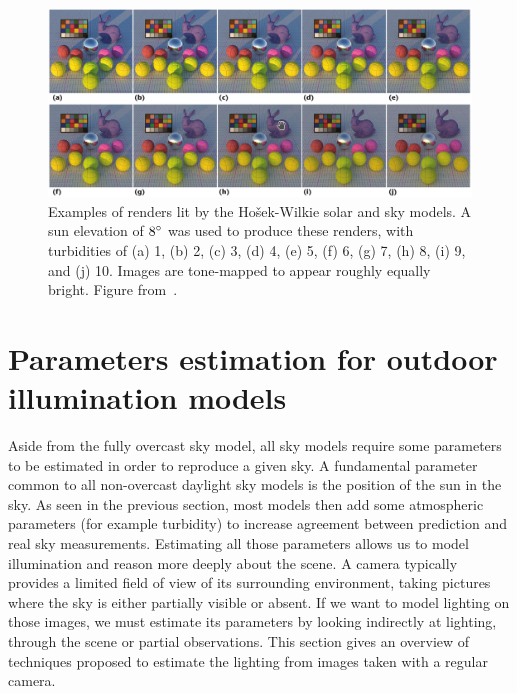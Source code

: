 \begin{figure}
\centering
\includegraphics[width=0.96\linewidth]{3rdparty/hwsun-renders.png}
\caption[Examples renders lit by the Ho\v{s}ek-Wilkie solar and sky models]{Examples of renders lit by the Ho\v{s}ek-Wilkie solar and sky models. A sun elevation of $8^{\circ}$ was used to produce these renders, with turbidities of (a) 1, (b) 2, (c) 3, (d) 4, (e) 5, (f) 6, (g) 7, (h) 8, (i) 9, and (j) 10. Images are tone-mapped to appear roughly equally bright. Figure from~\cite{hosek-siggraph-12}.}
\label{fig:hw_renders_model}
\end{figure}

\section{Parameters estimation for outdoor illumination models}
\label{sec:sky_param_estim}

Aside from the fully overcast sky model, all sky models require some parameters to be estimated in order to reproduce a given sky. A fundamental parameter common to all non-overcast daylight sky models is the position of the sun in the sky. As seen in the previous section, most models then add some atmospheric parameters (for example turbidity) to increase agreement between prediction and real sky measurements. Estimating all those parameters allows us to model illumination and reason more deeply about the scene. A camera typically provides a limited field of view of its surrounding environment, taking pictures where the sky is either partially visible or absent. If we want to model lighting on those images, we must estimate its parameters by looking indirectly at lighting, through the scene or partial observations. This section gives an overview of techniques proposed to estimate the lighting from images taken with a regular camera. 

